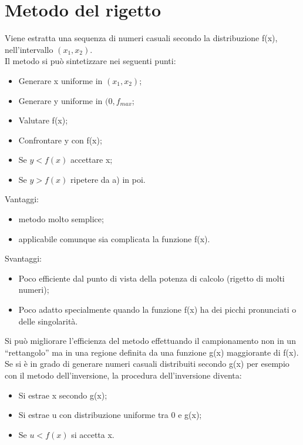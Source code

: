 \documentclass[12pt, letterpaper]{book}
\begin{document}
\section{Metodo del rigetto}
Viene estratta una sequenza di numeri casuali secondo la distribuzione f(x), nell’intervallo $(x_1,x_2)$.\\
Il metodo si può sintetizzare nei seguenti punti:
\begin{itemize}
    \item Generare x uniforme in $(x_1,x_2)$;
    \item Generare y uniforme in $(0,f_{max}$;
    \item Valutare f(x);
    \item Confrontare y con f(x);
    \item Se $y < f(x)$ accettare x;
    \item Se $y > f(x)$ ripetere da a) in poi.
\end{itemize}
Vantaggi: 
\begin{itemize}
    \item metodo molto semplice;
    \item applicabile comunque sia complicata la funzione f(x).
\end{itemize}
Svantaggi:
\begin{itemize}
    \item Poco efficiente dal punto di vista della potenza di calcolo (rigetto di molti numeri);
    \item Poco adatto specialmente quando la funzione f(x) ha dei picchi pronunciati o delle singolarità.
\end{itemize}
Si può migliorare l’efficienza del metodo effettuando il campionamento non in un “rettangolo” ma in una regione definita da una funzione g(x) maggiorante di f(x).\\
Se si è in grado di generare numeri casuali distribuiti secondo g(x) per esempio con il metodo dell'inversione, la procedura dell'inversione diventa:
\begin{itemize}
    \item Si estrae x secondo g(x);
    \item Si estrae u con distribuzione uniforme tra 0 e g(x);
    \item Se $u < f(x)$ si accetta x.
\end{itemize}
\end{document}
